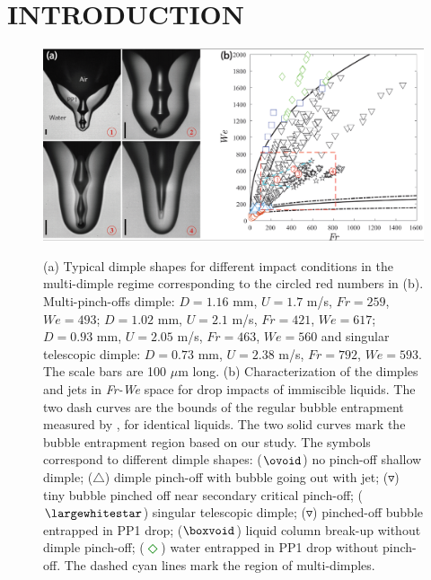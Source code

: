 \documentclass[10pt, a4paper]{article}
\begin{document}
\section{INTRODUCTION}
\begin{figure}[!b]
  \centering
      \includegraphics[width=0.75\linewidth]{figures/fig1.png}\vspace{-0.05in}\\ %
  \caption{\fontsize{9}{9}\selectfont (a) Typical dimple shapes for different impact conditions in the multi-dimple regime corresponding to the  circled red numbers in (b). Multi-pinch-offs dimple:   
  $D=1.16$ mm, $U=1.7$ m/s, $Fr=259$, $We= 493$; 
   $D=1.02$ mm, $U=2.1$ m/s, $Fr=421$, $We= 617$;
   $D=0.93$ mm, $U=2.05$ m/s, $Fr=463$, $We= 560$ and singular telescopic dimple:  $D=0.73$ mm, $U=2.38$ m/s, $Fr=792$, $We= 593$.  The scale bars are 100 $\mu$m long.
  (b) Characterization of the dimples and jets in {\it Fr-We} space for drop impacts of immiscible liquids.
 The two dash curves are the bounds of the regular bubble entrapment measured by \cite{Ref8,Ref9}, for identical liquids. 
 The two solid curves mark the bubble entrapment region based on our study.
 The symbols correspond to different dimple shapes:
  (\textcolor{mypink1}{$\ovoid$}) no pinch-off shallow dimple; 
  (\textcolor{mypink2}{$\triangle$}) dimple pinch-off with bubble going out with jet; 
  (\textcolor{black}{$\triangledown$}) tiny bubble pinched off near secondary critical pinch-off;
  (\textcolor{black}{$\largewhitestar$}) singular telescopic dimple;
  (\textcolor{black}{$\triangledown$}) pinched-off bubble entrapped in PP1 drop;
  (\textcolor{blue}{$\boxvoid$}) liquid column break-up without dimple pinch-off; 
  (\textcolor{green}{$\Diamond$}) water entrapped in PP1 drop without pinch-off.
  The dashed cyan lines mark the region of multi-dimples.}
  \label{Fig_2}
\end{figure}
\end{document}

